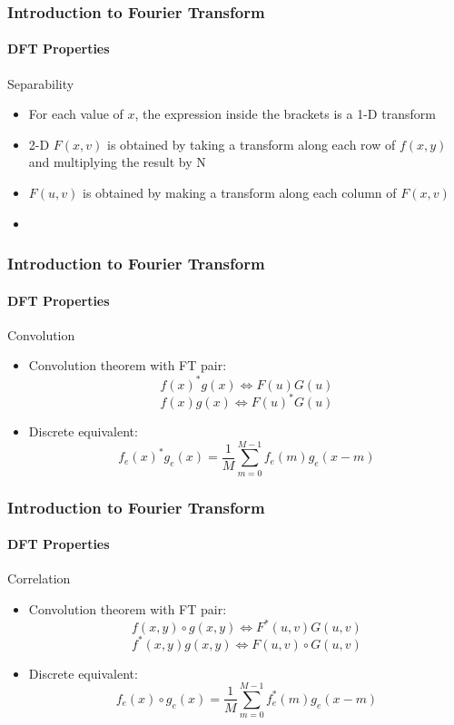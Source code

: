 \documentclass{beamer}
\begin{document}
\begin{frame}
\frametitle{Introduction to Fourier Transform}
\framesubtitle{DFT Properties}
\begin{block}{Separability}
\scriptsize{
\begin{itemize}
\item For each value of $x$, the expression inside the brackets is a 1-D transform
\item 2-D $F(x,v)$ is obtained by taking a transform along each row of $f(x,y)$ and multiplying the result by N 
\item $F(u,v)$ is obtained by making a transform along each column of $F(x,v)$
\item[]
\end{itemize}
}
\end{block}
\end{frame}
\begin{frame}
\frametitle{Introduction to Fourier Transform}
\framesubtitle{DFT Properties}
\begin{block}{Convolution}
\begin{itemize}
\item Convolution theorem with FT pair: 
$$f(x)^\ast g(x) \Leftrightarrow F(u)G(u)$$
$$f(x)g(x) \Leftrightarrow F(u)^\ast G(u)$$
\item Discrete equivalent: 
$$f_{e}(x)^\ast g_{e}(x) = \frac{1}{M} \sum^{M-1}_{m=0}f_{e}(m)g_{e}(x-m)$$ 
\end{itemize}
\end{block}
\end{frame}
\begin{frame}
\frametitle{Introduction to Fourier Transform}
\framesubtitle{DFT Properties}
\begin{block}{Correlation}
\begin{itemize}
\item Convolution theorem with FT pair: 
$$f(x,y) \circ g(x,y) \Leftrightarrow F^\ast(u,v)G(u,v)$$
$$f^\ast(x,y)g(x,y) \Leftrightarrow F(u,v) \circ G(u,v)$$
\item Discrete equivalent: 
$$f_{e}(x)\circ g_{e}(x) = \frac{1}{M} \sum^{M-1}_{m=0}f_{e}^{\ast}(m)g_{e}(x-m)$$ 
\end{itemize}
\end{block}
\end{frame}
\end{document}
